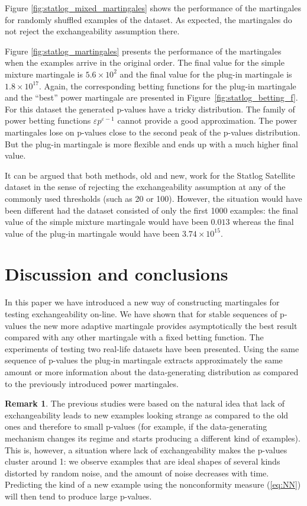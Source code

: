\documentclass{article}
\theoremstyle{definition}
\newtheorem*{remark}{Remark}
\begin{document}
Figure \ref{fig:statlog_mixed_martingales} shows the performance of the  martingales
for randomly shuffled examples of the dataset.
As expected, the martingales do not reject the exchangeability assumption there.

Figure \ref{fig:statlog_martingales} presents the performance of the  martingales
when the examples arrive in the original order.
The final value for the simple mixture martingale is $5.6\times10^{2}$ and the final value for the plug-in martingale
is $1.8\times10^{17}$.
Again, the corresponding betting functions for the plug-in martingale and the ``best''
power martingale are presented in Figure~\ref{fig:statlog_betting_f}.
For this dataset the generated p-values have a tricky distribution.
The family of power betting functions $\varepsilon p^{\varepsilon - 1}$ cannot provide
a good approximation.
The power martingales lose on p-values close to the second peak of the p-values distribution.
But the plug-in martingale is more flexible and ends up with a much higher final value.

It can be argued that both methods, old and new, work for the Statlog Satellite dataset
in the sense of rejecting the exchangeability assumption
at any of the commonly used thresholds (such as 20 or 100).
However, the situation would have been different had the dataset consisted
of only the first 1000 examples:
the final value of the simple mixture martingale would have been $0.013$
whereas the final value of the plug-in martingale would have been $3.74 \times 10^{15}$.

\section{Discussion and conclusions}\label{sec:conclusion}

In this paper we have introduced a new way of constructing martingales
for testing exchangeability on-line.
We have shown that for stable sequences of p-values the new more adaptive martingale provides asymptotically
the best result compared with any other martingale with a fixed betting function.
The experiments of testing two real-life datasets have been presented.
Using the same sequence of p-values the plug-in martingale extracts approximately the same amount
or more information about the data-generating distribution
as compared to the previously introduced power martingales.

\begin{remark}
  The previous studies were based on the natural idea that lack of exchangeability
  leads to new examples looking strange as compared to the old ones
  and therefore to small p-values
  (for example, if the data-generating mechanism changes its regime
  and starts producing a different kind of examples).
  This is, however, a situation where lack of exchangeability makes the p-values cluster around 1:
  we observe examples that are ideal shapes of several kinds distorted by random noise,
  and the amount of noise decreases with time.
  Predicting the kind of a new example using the nonconformity measure (\ref{eq:NN})
  will then tend to produce large p-values.
\end{remark}
\end{document}
